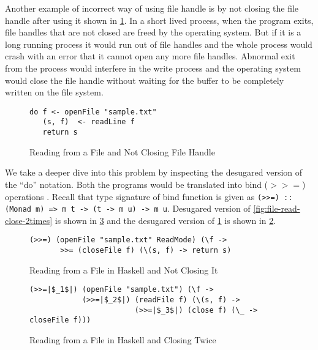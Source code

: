 Another example of incorrect way of using file handle is by not closing the file handle after using it shown in \cref{fig:file-read-noclose}.
In a short lived process, when the program exits, file handles that are not closed are freed by the operating system.
But if it is a long running process it would run out of file handles and the whole process would crash with an error that
it cannot open any more file handles. Abnormal exit from the process would interfere in the write process
and the operating system would close the file handle without waiting for the buffer to be completely
written on the file system.
\begin{figure}[h]
  \begin{framed}
    \begin{verbatim}
do f <- openFile "sample.txt"
   (s, f)  <- readLine f
   return s
    \end{verbatim}
  \end{framed}
  \caption{Reading from a File and Not Closing File Handle}
  \label{fig:file-read-noclose}
\end{figure}

We take a deeper dive into this problem by inspecting the desugared version of the ``do'' notation.
Both the programs would be translated into bind ($>>=$) operations . Recall that type signature of bind function is given as
\texttt{(>>=) :: (Monad m) => m t -> (t -> m u) -> m u}. Desugared version of \cref{fig:file-read-close-2times}
is shown in \cref{fig:file-read-close-2times-desugared} and the desugared version of \cref{fig:file-read-noclose} is shown in \cref{fig:file-read-noclose-desugared}.

\begin{figure}[h]
\begin{framed}
\begin{verbatim}
(>>=) (openFile "sample.txt" ReadMode) (\f ->
       >>= (closeFile f) (\(s, f) -> return s)
\end{verbatim}
  \end{framed}
  \caption{Reading from a File in Haskell and Not Closing It}
  \label{fig:file-read-noclose-desugared}
\end{figure}

\begin{figure}[h]
  \begin{framed}
    \begin{verbatim}
(>>=|$_1$|) (openFile "sample.txt") (\f ->
            (>>=|$_2$|) (readFile f) (\(s, f) ->
                        (>>=|$_3$|) (close f) (\_ -> closeFile f)))
    \end{verbatim}
  \end{framed}
  \caption{Reading from a File in Haskell and Closing Twice}
  \label{fig:file-read-close-2times-desugared}
\end{figure}

